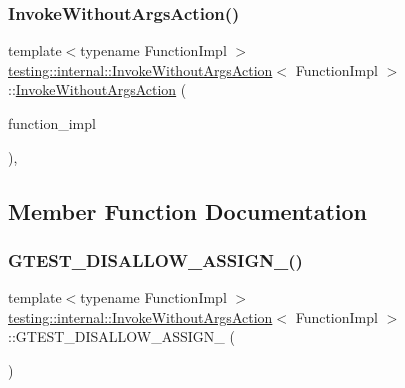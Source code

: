 \subsubsection{\texorpdfstring{InvokeWithoutArgsAction()}{InvokeWithoutArgsAction()}}
{\footnotesize\ttfamily template$<$typename Function\+Impl $>$ \\
\mbox{\hyperlink{structtesting_1_1internal_1_1_invoke_without_args_action}{testing\+::internal\+::\+Invoke\+Without\+Args\+Action}}$<$ Function\+Impl $>$\+::\mbox{\hyperlink{structtesting_1_1internal_1_1_invoke_without_args_action}{Invoke\+Without\+Args\+Action}} (\begin{DoxyParamCaption}\item[{Function\+Impl}]{function\+\_\+impl }\end{DoxyParamCaption})\hspace{0.3cm}{\ttfamily [inline]}, {\ttfamily [explicit]}}



\subsection{Member Function Documentation}
\mbox{\label{structtesting_1_1internal_1_1_invoke_without_args_action_a0fd67dbc88793c8a9cf3c31ab44de1c0}} 
\subsubsection{\texorpdfstring{GTEST\_DISALLOW\_ASSIGN\_()}{GTEST\_DISALLOW\_ASSIGN\_()}}
{\footnotesize\ttfamily template$<$typename Function\+Impl $>$ \\
\mbox{\hyperlink{structtesting_1_1internal_1_1_invoke_without_args_action}{testing\+::internal\+::\+Invoke\+Without\+Args\+Action}}$<$ Function\+Impl $>$\+::G\+T\+E\+S\+T\+\_\+\+D\+I\+S\+A\+L\+L\+O\+W\+\_\+\+A\+S\+S\+I\+G\+N\+\_\+ (\begin{DoxyParamCaption}\item[{\mbox{\hyperlink{structtesting_1_1internal_1_1_invoke_without_args_action}{Invoke\+Without\+Args\+Action}}$<$ Function\+Impl $>$}]{ }\end{DoxyParamCaption})\hspace{0.3cm}{\ttfamily [private]}}

